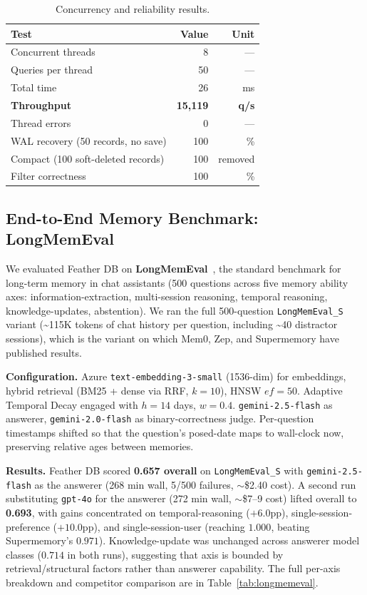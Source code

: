 \documentclass[11pt,twocolumn]{article}
\begin{document}
\begin{table}[h]
\centering
\caption{Concurrency and reliability results.}
\label{tab:reliability}
\begin{tabular}{lrr}
\toprule
Test & Value & Unit \\
\midrule
Concurrent threads & 8 & --- \\
Queries per thread & 50 & --- \\
Total time & 26 & ms \\
\textbf{Throughput} & \textbf{15,119} & \textbf{q/s} \\
Thread errors & 0 & --- \\
\midrule
WAL recovery (50 records, no save) & 100 & \% \\
Compact (100 soft-deleted records) & 100 & removed \\
Filter correctness & 100 & \% \\
\bottomrule
\end{tabular}
\end{table}

\subsection{End-to-End Memory Benchmark: LongMemEval}
\label{sec:longmemeval}

We evaluated Feather DB on \textbf{LongMemEval}~\cite{xu2024longmemeval}, the
standard benchmark for long-term memory in chat assistants (500 questions
across five memory ability axes: information-extraction, multi-session
reasoning, temporal reasoning, knowledge-updates, abstention). We ran the full
500-question \texttt{LongMemEval\_S} variant (\textasciitilde{}115K tokens of
chat history per question, including \textasciitilde{}40 distractor sessions),
which is the variant on which Mem0, Zep, and Supermemory have published
results.

\textbf{Configuration.} Azure \texttt{text-embedding-3-small} (1536-dim) for
embeddings, hybrid retrieval (BM25 + dense via RRF, $k=10$), HNSW
$ef=50$. Adaptive Temporal Decay engaged with $h=14$ days, $w=0.4$.
\texttt{gemini-2.5-flash} as answerer, \texttt{gemini-2.0-flash} as
binary-correctness judge. Per-question timestamps shifted so that the
question's posed-date maps to wall-clock now, preserving relative ages
between memories.

\textbf{Results.} Feather DB scored \textbf{0.657 overall} on
\texttt{LongMemEval\_S} with \texttt{gemini-2.5-flash} as the answerer
(268 min wall, 5/500 failures, $\sim$\$2.40 cost). A second run substituting
\texttt{gpt-4o} for the answerer (272 min wall, $\sim$\$7--9 cost) lifted
overall to \textbf{0.693}, with gains concentrated on temporal-reasoning
($+6.0$pp), single-session-preference ($+10.0$pp), and single-session-user
(reaching $1.000$, beating Supermemory's $0.971$). Knowledge-update was
unchanged across answerer model classes ($0.714$ in both runs), suggesting
that axis is bounded by retrieval/structural factors rather than answerer
capability. The full per-axis breakdown and competitor comparison are in
Table~\ref{tab:longmemeval}.
\end{document}
